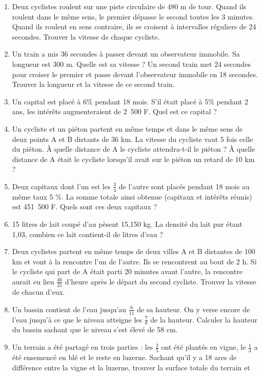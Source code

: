 \documentclass[12 pt]{extarticle}
\theoremstyle{plain}
\begin{document}
\begin{enumerate}
 \item Deux cyclistes roulent sur une piste circulaire de 480 m de tour. Quand ils roulent dans le même sens, le premier dépasse le 
 second toutes les 3 minutes. Quand ils roulent en sens contraire, ils se croisent à intervalles réguliers de 24 secondes. Trouver la 
 vitesse de chaque cycliste. 
 \item Un train a mis 36 secondes à passer devant un observateur immobile. Sa longueur est 300 m. Quelle est sa vitesse ? Un second 
 train met 24 secondes pour croiser le premier et passe devant l'observateur immobile en 18 secondes. Trouver la longueur et la 
 vitesse de ce second train. 
 \item Un capital est placé à 6\% pendant 18 mois. S'il était placé à 5\% pendant 2 ans, les intérêts augmenteraient de 2~500 F. Quel 
 est ce capital ?
 \item Un cycliste et un piéton partent en même temps et dans le même sens de deux points A et B distants de 36 km. La vitesse du cycliste vaut 5 fois celle du piéton. À quelle distance de A le cycliste attendra-t-il le piéton ? À quelle distance de A était le cycliste lorsqu'il avait sur le piéton un retard de 10 km ?  
 \item Deux capitaux dont l'un est les $\frac34$ de l'autre sont placés pendant 18 mois au même taux 5 \%. La somme totale ainsi obtenue (capitaux et intérêts réunis) est 451~500 F. Quels sont ces deux capitaux ? 
 \item 15 litres de lait coupé d'au pèsent 15,150 kg. La densité du lait pur étant 1,03, combien ce lait contient-il de litres d'eau ? 
 \item Deux cyclistes partent en même temps de deux villes A et B distantes de 100 km et vont à la rencontre l'un de l'autre. Ils 
 se rencontrent au bout de 2 h. Si le cycliste qui part de A était parti 20 minutes avant l'autre, la rencontre aurait eu lieu
 $\frac{46}{25}$ d'heure après le départ du second cycliste. Trouver la vitesse de chacun d'eux. 
 \item Un bassin contient de l'eau jusqu'au $\frac6{11}$ de sa hauteur. On y verse encore de l'eau jusqu'à ce que le niveau atteigne les $\frac78$ de la hauteur. Calculer la hauteur du bassin sachant que le niveau s'est élevé de 58 cm.
 \item Un terrain a été partagé en trois parties : les $\frac25$ ont été plantés en vigne, le $\frac13$ a été ensemencé en blé et le reste en luzerne. Sachant qu'il y a 18 ares de différence entre la vigne et la luzerne, trouver la surface totale du terrain et

\end{enumerate}
\end{document}

